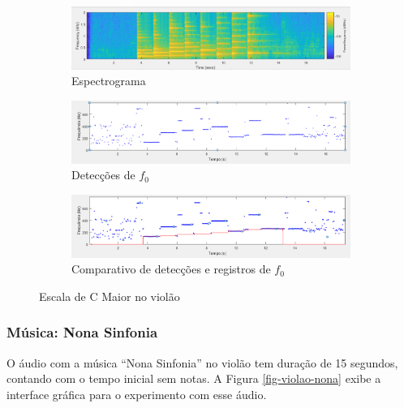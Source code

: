 \begin{figure}
	
	\begin{subfigure}{1\textwidth}
		\includegraphics[width=\linewidth]{pasta1_figuras/violao-escala-2.png}
		\caption{Espectrograma}
		\label{fig-violao-escala-2}
	\end{subfigure}
	
	\begin{subfigure}{1\textwidth}
		\includegraphics[width=\linewidth]{pasta1_figuras/violao-escala-3.png}
		\caption{Detecções de $f_0$}
		\label{fig-violao-escala-3}
	\end{subfigure}
	
	\begin{subfigure}{1\textwidth}
		\includegraphics[width=\linewidth]{pasta1_figuras/violao-escala-4.png}
		\caption{Comparativo de detecções e registros de $f_0$}
		\label{fig-violao-escala-4}
	\end{subfigure}
	\caption{Escala de C Maior no violão}
\end{figure}

\subsubsection{Música: Nona Sinfonia}

O áudio com a música ``Nona Sinfonia'' no violão tem duração de 15 segundos, contando com o tempo inicial sem notas. A Figura \ref{fig-violao-nona} exibe a interface gráfica para o experimento com esse áudio.

